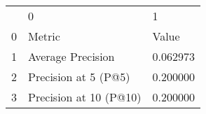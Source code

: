 \begin{tabular}{lll}
 & 0 & 1 \\
0 & Metric & Value \\
1 & Average Precision & 0.062973 \\
2 & Precision at 5 (P@5) & 0.200000 \\
3 & Precision at 10 (P@10) & 0.200000 \\
\end{tabular}
